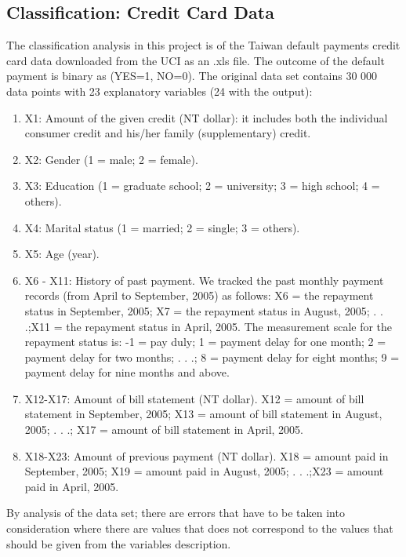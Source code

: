 \documentclass[12pt,a4paper,english]{article}
\begin{document}
\subsection{Classification: Credit Card Data}
The classification analysis in this project is of the Taiwan default payments credit card data downloaded from the UCI \cite{UCI} as an .xls file. The outcome of the default payment is binary as (YES=1, NO=0). The original data set contains 30 000 data points with 23 explanatory variables (24 with the output):
\begin{enumerate}
	\item X1: Amount of the given credit (NT dollar): it includes both the individual consumer credit and his/her family (supplementary) credit. 
	\item X2: Gender (1 = male; 2 = female). 
	\item X3: Education (1 = graduate school; 2 = university; 3 = high school; 4 = others). 
	\item X4: Marital status (1 = married; 2 = single; 3 = others). 
	\item X5: Age (year). 
	\item X6 - X11: History of past payment. We tracked the past monthly payment records (from April to September, 2005) as follows: X6 = the repayment status in September, 2005; X7 = the repayment status in August, 2005; . . .;X11 = the repayment status in April, 2005. The measurement scale for the repayment status is: -1 = pay duly; 1 = payment delay for one month; 2 = payment delay for two months; . . .; 8 = payment delay for eight months; 9 = payment delay for nine months and above. 
	\item X12-X17: Amount of bill statement (NT dollar). X12 = amount of bill statement in September, 2005; X13 = amount of bill statement in August, 2005; . . .; X17 = amount of bill statement in April, 2005. 
	\item X18-X23: Amount of previous payment (NT dollar). X18 = amount paid in September, 2005; X19 = amount paid in August, 2005; . . .;X23 = amount paid in April, 2005. 
\end{enumerate}
By analysis of the data set; there are errors that have to be taken into consideration where there are values that does not correspond to the values that should be given from the variables description.
\end{document}
